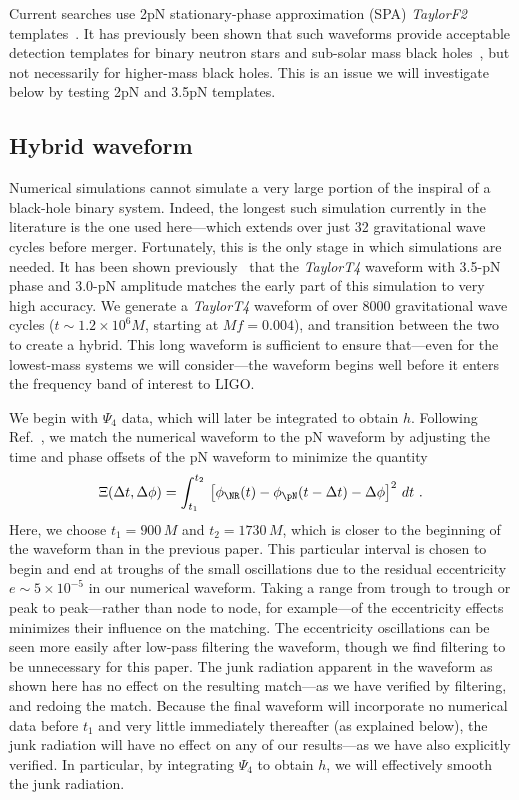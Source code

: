 Current searches use 2pN stationary-phase approximation (SPA)
\textit{TaylorF2} templates~\cite{Abbott:2008}.  It has previously
been shown that such waveforms provide acceptable detection templates
for binary neutron stars and sub-solar mass black
holes~\cite{Droz:1999qx}, but not necessarily for higher-mass black
holes.  This is an issue we will investigate below by testing 2pN and
3.5pN templates.




\subsection{Hybrid waveform}
\label{sec:HybridWaveform} %
Numerical simulations cannot simulate a very large portion of the
inspiral of a black-hole binary system.  Indeed, the longest such
simulation currently in the literature is the one used here---which
extends over just 32 gravitational wave cycles before merger.
Fortunately, this is the only stage in which simulations are needed.
It has been shown previously~\cite{Boyle2007} that the
\textit{TaylorT4} waveform with 3.5-pN phase and 3.0-pN amplitude
matches the early part of this simulation to very high accuracy.  We
generate a \textit{TaylorT4} waveform of over 8000 gravitational wave
cycles ($t \sim 1.2\times 10^{6}M$, starting at $M f=0.004$), and
transition between the two to create a hybrid.  This long waveform is
sufficient to ensure that---even for the lowest-mass systems we will
consider---the waveform begins well before it enters the frequency
band of interest to LIGO.

We begin with $\Psi_4$ data, which will later be integrated to obtain
$h$.  Following Ref.~\cite{Boyle2008a}, we match the numerical
waveform to the pN waveform by adjusting the time and phase offsets of
the pN waveform to minimize the quantity
\begin{equation}
  \label{eq:MatchingChiSquared}
  \Xi(\Delta t, \Delta \phi) = \int_{t_{1}}^{t_{2}}\, \left[
    \phi_{\NR}(t) - \phi_{\pN}(t - \Delta t) - \Delta \phi
  \right]^{2}\, d t \ .
\end{equation}
Here, we choose $t_{1}=900\,M$ and $t_{2}=1730\,M$, which is closer to
the beginning of the waveform than in the previous paper.  This
particular interval is chosen to begin and end at troughs of the small
oscillations due to the residual eccentricity $e\sim 5\times 10^{-5}$
in our numerical waveform.  Taking a range from trough to trough or
peak to peak---rather than node to node, for example---of the
eccentricity effects minimizes their influence on the matching.  The
eccentricity oscillations can be seen more easily after low-pass
filtering the waveform, though we find filtering to be unnecessary for
this paper.  The junk radiation apparent in the waveform as shown here
has no effect on the resulting match---as we have verified by
filtering, and redoing the match.  Because the final waveform will
incorporate no numerical data before $t_{1}$ and very little
immediately thereafter (as explained below), the junk radiation will
have no effect on any of our results---as we have also explicitly
verified.  In particular, by integrating $\Psi_{4}$ to obtain $h$, we
will effectively smooth the junk radiation.


